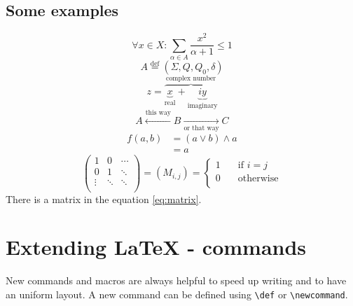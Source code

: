 \subsection*{Some examples}
\[ \forall x \in X: \sum_{\alpha \in A} \frac{x^2}{\alpha + 1} \leq 1 \]
\[ A \overset{\textrm{def}}{=} (\Sigma, Q, Q_0, \delta) \]
\[ z = \overbrace{
	\underbrace{x}_\text{real} +
	\underbrace{iy}_\text{imaginary}
	}^\text{complex number}
\]
\[ A \xleftarrow{\text{this way}} B
	\xrightarrow[\text{or that way}]{} C \]
\begin{align*}
f(a, b)
	&= (a \vee b) \wedge a \\
	&= a
\end{align*}
\begin{equation}
\label{eq:matrix}
\begin{pmatrix}
1 & 0 & \cdots \\
0 & 1 & \ddots \\
\vdots & \ddots & \ddots \\
\end{pmatrix}
= (M_{i,j}) = \left\lbrace\begin{array}{cl}
1 & \quad \text{if $i = j$} \\
0 & \quad \text{otherwise} \\
\end{array}\right.
\end{equation}
There is a matrix in the equation \eqref{eq:matrix}.

\section{Extending \LaTeX{} - commands}

New commands and macros are always helpful to speed up writing and to have an
uniform layout.
A new command can be defined using \lstinline$\def$ or \lstinline$\newcommand$.

